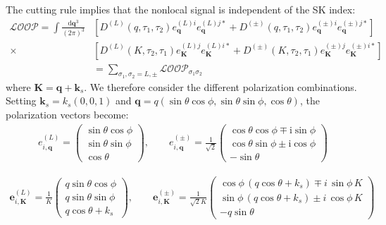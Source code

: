\documentclass[a4paper,12pt]{article}
\def\di{{\mathrm{d}}}
\def\mb{\mathbf}
\begin{document}
The cutting rule implies that the nonlocal signal is independent of the SK index:
\begin{align}
    \mathcal{LOOP} = \int \frac{\di \mb{q}^3}{(2\pi)^3} &\left[ D^{(L)}(q,\tau_1,\tau_2) e^{(L)i}_{\mb q} e^{(L)j*}_{\mb q} + D^{(\pm)}(q,\tau_1,\tau_2) e^{(\pm)i}_{\mb q} e^{(\pm)j*}_{\mb q} \right] \nonumber \\
    \times &\left[ D^{(L)}(K,\tau_2,\tau_1) e^{(L)j}_{\mb K} e^{(L)i*}_{\mb K} + D^{(\pm)}(K,\tau_2,\tau_1) e^{(\pm)j}_{\mb K} e^{(\pm)i*}_{\mb K} \right] \\
    &= \sum_{\sigma_1,\sigma_2=L,\pm} \mathcal{{LOOP}}_{\sigma_1\sigma_2}
\end{align}
where $\mb K=\mb q+\mb k_s$. We therefore consider the different polarization combinations. Setting $\mb k_s=k_s(0,0,1)$ and $\mb q=q(\sin\theta\cos\phi,\sin\theta\sin\phi,\cos\theta)$, the polarization vectors become:
\begin{align}
    e_{i,\mathbf{q}}^{(L)} = \begin{pmatrix} \sin\theta\cos\phi \\ \sin\theta\sin\phi \\ \cos\theta \end{pmatrix},\qquad
    e_{i,\mathbf{q}}^{(\pm)} = \frac{1}{\sqrt{2}} \begin{pmatrix} \cos\theta\cos\phi \mp \mathrm{i}\sin\phi \\ \cos\theta\sin\phi \pm \mathrm{i}\cos\phi \\ -\sin\theta \end{pmatrix}
\end{align}

\begin{align}
    \mathbf{e}_{i,\mathbf{K}}^{(L)} = 
    \frac{1}{K}
    \begin{pmatrix}
    q\sin\theta\cos\phi \\
    q\sin\theta\sin\phi \\
    q\cos\theta + k_s
    \end{pmatrix},\qquad
    \mathbf{e}_{i,\mathbf{K}}^{(\pm)} = 
    \frac{1}{\sqrt{2} K}
    \begin{pmatrix}
    \cos\phi\,(q\cos\theta + k_s) \mp i\,\sin\phi\,K \\
    \sin\phi\,(q\cos\theta + k_s) \pm i\,\cos\phi\,K\\
    -q\sin\theta
    \end{pmatrix}
\end{align}
\end{document}
